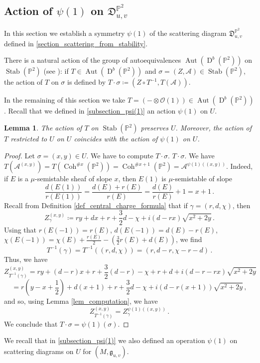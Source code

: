 \documentclass[12pt, a4paper]{amsart}
\newtheorem{lem}[defn]{Lemma}
\newcommand\PP{\mathbb P}
\newcommand\cA{\mathcal A}
\newcommand\cO{\mathcal O}
\newcommand\fD{\mathfrak D}
\newcommand\fg{\mathfrak g}
\newcommand\Aut{\operatorname{Aut}}
\newcommand\Coh{\operatorname{Coh}}
\newcommand\Stab{\operatorname{Stab}}
\newcommand\D{\operatorname{D}}
\begin{document}
\subsection{Action of $\psi(1)$ on $\fD_{u,v}^{\PP^2}$}
\label{subsection_psi(1)_P2}

In this section we establish a symmetry 
$\psi(1)$ of the scattering diagram 
$\fD^{\PP^2}_{u,v}$ defined in
\cref{section_scattering_from_stability}.

There is a natural action of the group of autoequivalences $\Aut (\D^b(\PP^2))$ on $\Stab (\PP^2)$ (see \cite[Lemma 8.2]{MR2373143}):
if $T \in \Aut (\D^b(\PP^2))$ and 
$\sigma=(Z,\cA) \in \Stab(\PP^2)$, the action of $T$ on $\sigma$ is defined by 
$T \cdot \sigma \coloneq (Z \circ T^{-1},
T(\cA))$.

In the remaining of this section we take $T=(-\otimes \cO(1)) \in 
\Aut (\D^b(\PP^2))$. 
Recall that we defined in
\cref{subsection_psi(1)} an action 
$\psi(1)$ on $U$.

\begin{lem} \label{lem_T_action}
The action of $T$ on $\Stab(\PP^2)$ 
preserves $U$. Moreover, the action of $T$
restricted to $U$ on $U$
coincides with the action of $\psi(1)$
on $U$.
\end{lem}
 
\begin{proof}
Let $\sigma=(x,y) \in U$. We have to compute $T \cdot \sigma$. 
$T \cdot \sigma$.
We have $T(\cA^{(x,y)})=
T( \Coh^{\texttt{\#}x}(\PP^2))
= \Coh^{\texttt{\#}x+1}(\PP^2)
=
\cA^{\psi(1)((x,y))}$. Indeed, if $E$ is a 
$\mu$-semistable sheaf of slope $x$, then 
$E(1)$ is $\mu$-semistable of slope
\[ \frac{d(E(1))}{r(E(1))}=
\frac{d(E)+r(E)}{r(E)}=\frac{d(E)}{r(E)}+1=x+1\,.\]
Recall from Definition \ref{def_central_charge_formula} that if 
$\gamma=(r,d,\chi)$, then 
\[Z_\gamma^{(x,y)} \coloneqq r y 
+dx
+r+\frac{3}{2}d-\chi
+i
(d-rx)\sqrt{x^2+2y}\,.\]
Using that
$r(E(-1))=r(E)$, $d(E(-1))=d(E)-r(E)$, $\chi(E(-1))=\chi(E)+\frac{r(E)}{2}-\left(\frac{3}{2}r(E)+d(E)\right)$,
we find 
\[ T^{-1}(\gamma)=T^{-1}
((r,d,\chi))=(r,d-r,\chi-r-d)\,.\]
Thus, we have 
\[ Z_{T^{-1}(\gamma)}^{(x,y)}
=ry+(d-r)x+r+\frac{3}{2}(d-r)
-\chi+r+d+i(d-r-rx)\sqrt{x^2+2y}\]
\[=r(y-x+\frac{1}{2})+d(x+1)
+r+\frac{3}{2}d-\chi+i(d-r(x+1))\sqrt{x^2+2y}\,,\]
and so, using Lemma \ref{lem_computation},
we have
\[ Z_{T^{-1}(\gamma)}^{(x,y)}
=Z_\gamma^{\psi(1)((x,y))}\,.\]
We conclude that $T \cdot \sigma =
\psi(1)(\sigma)$.
\end{proof}

We recall that in 
\cref{subsection_psi(1)} 
we also defined an operation 
$\psi(1)$ on scattering diagrams 
on $U$ for $(M,\fg_{u,v})$.
\end{document}
